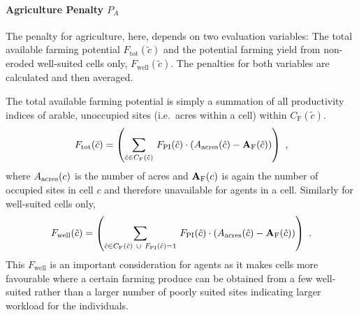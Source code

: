 



\paragraph{Agriculture Penalty $P_A$}
The penalty for agriculture, here, depends on two evaluation variables: 
The total available farming potential $F_\text{tot}(\tilde{c})$ and the potential farming yield from non-eroded well-suited cells only, $F_\text{well}(\tilde{c})$.
The penalties for both variables are calculated and then averaged.

The total available farming potential is simply a summation of all productivity indices of arable, unoccupied sites (i.e.\ acres within a cell) within $C_\text{F}(\tilde{c})$.
\begin{equation}
	F_\text{tot}(\tilde{c}) = \left( \sum_{\hat{c} \in C_{\rm F}(\tilde{c}) }\, F_{\rm PI}(\hat{c}) \cdot (A_{\rm acres}(\hat{c})  - \mathbf{A}_{\rm F}(\hat{c}) )\right) \ ,
\end{equation}
where $A_{\rm acres}(c)$ is the number of acres and $ \mathbf{A}_{\rm F}(c)$ is again the number of occupied sites in cell $c$ and therefore unavailable for agents in a cell.
Similarly for well-suited cells only, 
\begin{equation}
	F_\text{well}(\tilde{c}) = \left( \sum_{\hat{c} \in C_{\rm F}(\tilde{c}) \ \cup \ F_{\rm PI}(\hat{c})=1} \, F_{\rm PI}(\hat{c}) \cdot (A_{\rm acres}(\hat{c})  - \mathbf{A}_{\rm F}(\hat{c}) )\right) \ .
\end{equation}
This $F_\text{well}$ is an important consideration for agents as it makes cells
more favourable where a certain farming produce can be obtained from a few well-suited rather than a larger number of poorly suited sites indicating larger workload for the individuals.

